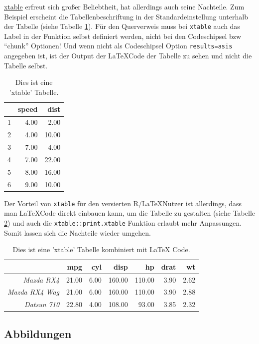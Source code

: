 \documentclass[a4paper,12pt]{article}
\begin{document}
\href{https://cran.r-project.org/web/packages/xtable/vignettes/xtableGallery.pdf}{xtable} erfreut sich großer Beliebtheit, hat allerdings auch seine Nachteile. Zum Beispiel erscheint die Tabellenbeschriftung in der Standardeinstellung unterhalb der Tabelle (siehe Tabelle \ref{tab:xtable1}). Für den Querverweis muss bei \texttt{xtable} auch das Label in der Funktion selbst definiert werden, nicht bei den Codeschipsel bzw \enquote{chunk} Optionen! Und wenn nicht als Codeschipsel Option \texttt{results=\textquotesingle{}asis\textquotesingle{}} angegeben ist, ist der Output der \LaTeX Code der Tabelle zu sehen und nicht die Tabelle selbst.
\begin{table}[ht]
\centering
\begin{tabular}{rrr}
  \hline
 & speed & dist \\ 
  \hline
1 & 4.00 & 2.00 \\ 
  2 & 4.00 & 10.00 \\ 
  3 & 7.00 & 4.00 \\ 
  4 & 7.00 & 22.00 \\ 
  5 & 8.00 & 16.00 \\ 
  6 & 9.00 & 10.00 \\ 
   \hline
\end{tabular}
\caption{Dies ist eine 'xtable' Tabelle.} 
\label{tab:xtable1}
\end{table}
Der Vorteil von \texttt{xtable} für den versierten R/\LaTeX Nutzer ist allerdings, dass man \LaTeX Code direkt einbauen kann, um die Tabelle zu gestalten (siehe Tabelle \ref{tab:xtable2}) und auch die \texttt{xtable::print.xtable} Funktion erlaubt mehr Anpassungen. Somit lassen sich die Nachteile wieder umgehen.
\begin{table}[ht]
\centering
\caption{Dies ist eine 'xtable' Tabelle kombiniert mit LaTeX Code.} 
\label{tab:xtable2}
\begin{tabular}{rrrrrrr}
  \toprule
 & {\Large{\bfseries{ mpg}}} & {\Large{\bfseries{ cyl}}} & {\Large{\bfseries{ disp}}} & {\Large{\bfseries{ hp}}} & {\Large{\bfseries{ drat}}} & {\Large{\bfseries{ wt}}} \\ 
  \midrule
{\emph{ Mazda RX4}} & 21.00 & 6.00 & 160.00 & 110.00 & 3.90 & 2.62 \\ 
  {\emph{ Mazda RX4 Wag}} & 21.00 & 6.00 & 160.00 & 110.00 & 3.90 & 2.88 \\ 
  {\emph{ Datsun 710}} & 22.80 & 4.00 & 108.00 & 93.00 & 3.85 & 2.32 \\ 
   \bottomrule
\end{tabular}
\end{table}
\hypertarget{abbildungen}{%
\subsection{Abbildungen}\label{abbildungen}}
\end{document}

